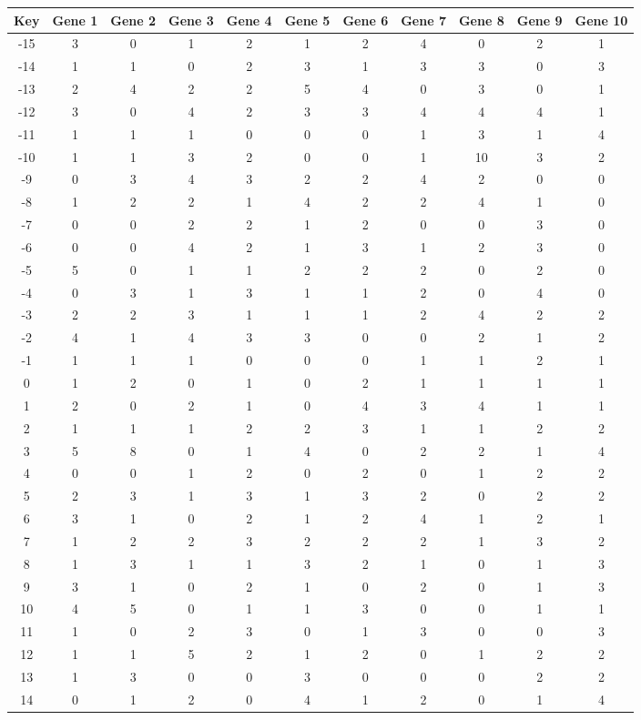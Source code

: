 \begin{tabular}{|c|c|c|c|c|c|c|c|c|c|c|}
\hline
Key & Gene 1 & Gene 2 & Gene 3 & Gene 4 & Gene 5 & Gene 6 & Gene 7 & Gene 8 & Gene 9 & Gene 10 \\
\hline
-15 & 3 & 0 & 1 & 2 & 1 & 2 & 4 & 0 & 2 & 1 \\
-14 & 1 & 1 & 0 & 2 & 3 & 1 & 3 & 3 & 0 & 3 \\
-13 & 2 & 4 & 2 & 2 & 5 & 4 & 0 & 3 & 0 & 1 \\
-12 & 3 & 0 & 4 & 2 & 3 & 3 & 4 & 4 & 4 & 1 \\
-11 & 1 & 1 & 1 & 0 & 0 & 0 & 1 & 3 & 1 & 4 \\
-10 & 1 & 1 & 3 & 2 & 0 & 0 & 1 & 10 & 3 & 2 \\
-9 & 0 & 3 & 4 & 3 & 2 & 2 & 4 & 2 & 0 & 0 \\
-8 & 1 & 2 & 2 & 1 & 4 & 2 & 2 & 4 & 1 & 0 \\
-7 & 0 & 0 & 2 & 2 & 1 & 2 & 0 & 0 & 3 & 0 \\
-6 & 0 & 0 & 4 & 2 & 1 & 3 & 1 & 2 & 3 & 0 \\
-5 & 5 & 0 & 1 & 1 & 2 & 2 & 2 & 0 & 2 & 0 \\
-4 & 0 & 3 & 1 & 3 & 1 & 1 & 2 & 0 & 4 & 0 \\
-3 & 2 & 2 & 3 & 1 & 1 & 1 & 2 & 4 & 2 & 2 \\
-2 & 4 & 1 & 4 & 3 & 3 & 0 & 0 & 2 & 1 & 2 \\
-1 & 1 & 1 & 1 & 0 & 0 & 0 & 1 & 1 & 2 & 1 \\
0 & 1 & 2 & 0 & 1 & 0 & 2 & 1 & 1 & 1 & 1 \\
1 & 2 & 0 & 2 & 1 & 0 & 4 & 3 & 4 & 1 & 1 \\
2 & 1 & 1 & 1 & 2 & 2 & 3 & 1 & 1 & 2 & 2 \\
3 & 5 & 8 & 0 & 1 & 4 & 0 & 2 & 2 & 1 & 4 \\
4 & 0 & 0 & 1 & 2 & 0 & 2 & 0 & 1 & 2 & 2 \\
5 & 2 & 3 & 1 & 3 & 1 & 3 & 2 & 0 & 2 & 2 \\
6 & 3 & 1 & 0 & 2 & 1 & 2 & 4 & 1 & 2 & 1 \\
7 & 1 & 2 & 2 & 3 & 2 & 2 & 2 & 1 & 3 & 2 \\
8 & 1 & 3 & 1 & 1 & 3 & 2 & 1 & 0 & 1 & 3 \\
9 & 3 & 1 & 0 & 2 & 1 & 0 & 2 & 0 & 1 & 3 \\
10 & 4 & 5 & 0 & 1 & 1 & 3 & 0 & 0 & 1 & 1 \\
11 & 1 & 0 & 2 & 3 & 0 & 1 & 3 & 0 & 0 & 3 \\
12 & 1 & 1 & 5 & 2 & 1 & 2 & 0 & 1 & 2 & 2 \\
13 & 1 & 3 & 0 & 0 & 3 & 0 & 0 & 0 & 2 & 2 \\
14 & 0 & 1 & 2 & 0 & 4 & 1 & 2 & 0 & 1 & 4 \\
\hline
\end{tabular}